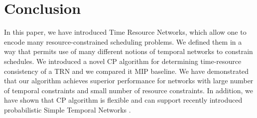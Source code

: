 \documentclass{article}
\begin{document}
\section{Conclusion}
In this paper, we have introduced Time Resource Networks, which allow one to encode many resource-constrained scheduling problems. We defined them in a way that permits use of many different notions of temporal networks to constrain schedules. We introduced a novel CP algorithm for determining time-resource consistency of a TRN and we compared it MIP baseline. We have demonstrated that our algorithm achieves superior performance for networks with large number of temporal constraints and small number of resource constraints. In addition, we have shown that CP algorithm is flexible and can support recently introduced probabilistic Simple Temporal Networks \cite{Fang2014}.




\end{document}
